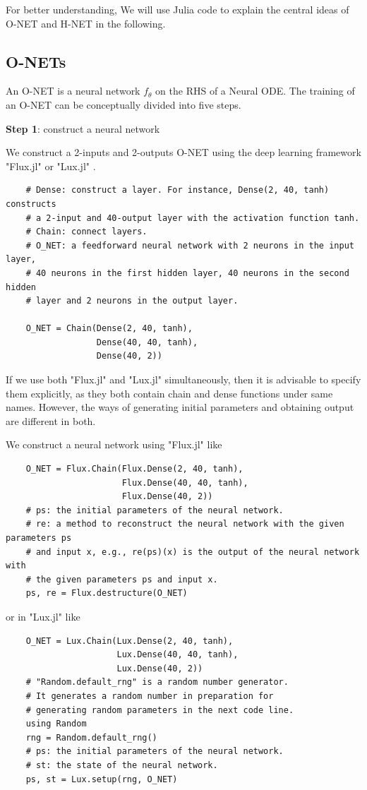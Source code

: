 \documentclass[
	parskip, 			   %
	twoside, 			   %
	DIV=14, 			   %
	BCOR=15.0mm, 		   %
	headsepline, 		   %
	open=right, 		   %
	captions=tableheading, %
	bibliography=totoc,    %
	numbers=noenddot       %
]{scrreprt}
\begin{document}
For better understanding, We will use Julia code to explain the central ideas of O-NET and H-NET in the following.

\subsection{O-NETs}
An O-NET is a neural network $f_{\theta}$ on the RHS of a Neural ODE. The training of an O-NET can be conceptually divided into five steps.

\textbf{Step 1}: construct a neural network

We construct a 2-inputs and 2-outputs O-NET using the deep learning framework "Flux.jl" or "Lux.jl" \cite{pal2022lux}.
\begin{verbatim}
    # Dense: construct a layer. For instance, Dense(2, 40, tanh) constructs 
    # a 2-input and 40-output layer with the activation function tanh.
    # Chain: connect layers.
    # O_NET: a feedforward neural network with 2 neurons in the input layer,
    # 40 neurons in the first hidden layer, 40 neurons in the second hidden 
    # layer and 2 neurons in the output layer.

    O_NET = Chain(Dense(2, 40, tanh),
                  Dense(40, 40, tanh),
                  Dense(40, 2))
\end{verbatim}

If we use both "Flux.jl" and "Lux.jl" simultaneously, then it is advisable to specify them explicitly, as they both contain chain and dense functions under same names. However, the ways of generating initial parameters and obtaining output are different in both.

We construct a neural network using "Flux.jl" like
\begin{verbatim}
    O_NET = Flux.Chain(Flux.Dense(2, 40, tanh),
                       Flux.Dense(40, 40, tanh),
                       Flux.Dense(40, 2))
    # ps: the initial parameters of the neural network. 
    # re: a method to reconstruct the neural network with the given parameters ps 
    # and input x, e.g., re(ps)(x) is the output of the neural network with 
    # the given parameters ps and input x.
    ps, re = Flux.destructure(O_NET)
\end{verbatim}

or in "Lux.jl" like
\begin{verbatim}
    O_NET = Lux.Chain(Lux.Dense(2, 40, tanh),
                      Lux.Dense(40, 40, tanh),
                      Lux.Dense(40, 2))
    # "Random.default_rng" is a random number generator. 
    # It generates a random number in preparation for 
    # generating random parameters in the next code line.
    using Random
    rng = Random.default_rng()
    # ps: the initial parameters of the neural network.
    # st: the state of the neural network. 
    ps, st = Lux.setup(rng, O_NET)
\end{verbatim}
\end{document}
